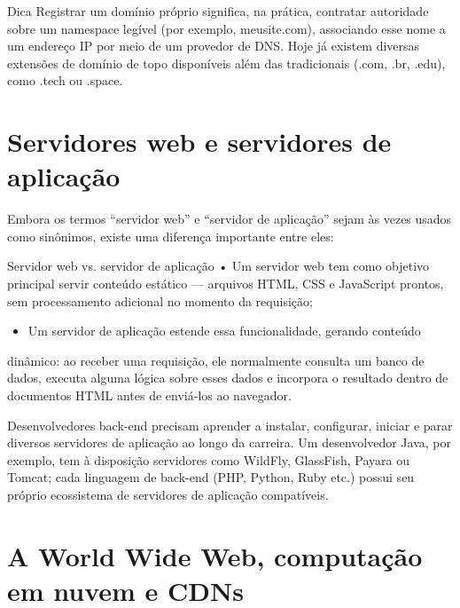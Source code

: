 \begin{infobox}{Dica}
Registrar um domínio próprio significa, na prática, contratar autoridade sobre um namespace legível (por exemplo, meusite.com), associando esse nome a um endereço IP por meio de um provedor de DNS. Hoje já existem diversas extensões de domínio de topo disponíveis além das tradicionais (.com, .br, .edu), como .tech ou .space.
\end{infobox}

\section{Servidores web e servidores de aplicação}

Embora os termos “servidor web” e “servidor de aplicação” sejam às vezes usados como sinônimos, existe uma diferença importante entre eles:

\begin{infobox}{Servidor web vs. servidor de aplicação}
• Um servidor web tem como objetivo principal servir conteúdo estático — arquivos HTML, CSS e JavaScript prontos, sem processamento adicional no momento da requisição;
\end{infobox}

\begin{itemize}
  \item Um servidor de aplicação estende essa funcionalidade, gerando conteúdo
\end{itemize}

dinâmico: ao receber uma requisição, ele normalmente consulta um banco de dados, executa alguma lógica sobre esses dados e incorpora o resultado dentro de documentos HTML antes de enviá-los ao navegador.

Desenvolvedores back-end precisam aprender a instalar, configurar, iniciar e parar diversos servidores de aplicação ao longo da carreira. Um desenvolvedor Java, por exemplo, tem à disposição servidores como WildFly, GlassFish, Payara ou Tomcat; cada linguagem de back-end (PHP, Python, Ruby etc.) possui seu próprio ecossistema de servidores de aplicação compatíveis.

\section{A World Wide Web, computação em nuvem e CDNs}

